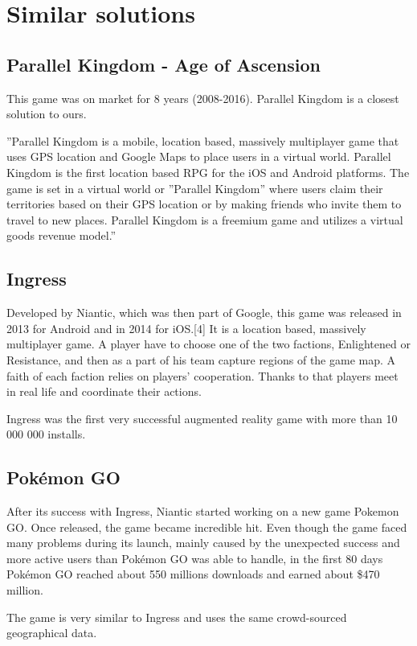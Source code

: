 
\section{Similar solutions}

	\subsection{Parallel Kingdom - Age of Ascension}
	This game was on market for 8 years (2008-2016). Parallel Kingdom is a closest solution to ours.
	
	
	”Parallel Kingdom is a mobile, location based, massively multiplayer game that uses GPS
	location and Google Maps to place users in a virtual world. Parallel Kingdom is the first
	location based RPG for the iOS and Android platforms. The game is set in a virtual world
	or ”Parallel Kingdom” where users claim their territories based on their GPS location or by making friends who invite them to travel to new places. Parallel Kingdom is a freemium
	game and utilizes a virtual goods revenue model.”
	
	\subsection{Ingress}
	Developed by Niantic, which was then part of Google, this game was released in 2013 for
	Android and in 2014 for iOS.[4] It is a location based, massively multiplayer game. A player have to choose one of the two factions, Enlightened or Resistance, and then as a part of his 	team capture regions of the game map. A faith of each faction relies on players’ cooperation. Thanks to that players meet in real life and coordinate their actions.
	
	Ingress was the first very successful augmented reality game with more than 10 000 000
	installs.
	
	\subsection{Pokémon GO}
	After its success with Ingress, Niantic started working on a new game Pokemon GO. Once
	released, the game became incredible hit. Even though the game faced many problems during
	its launch, mainly caused by the unexpected success and more active users than Pokémon
	GO was able to handle, in the first 80 days Pokémon GO reached about 550 millions downloads and earned about \$470 million.
		
	The game is very similar to Ingress and uses the same crowd-sourced geographical data.
	
